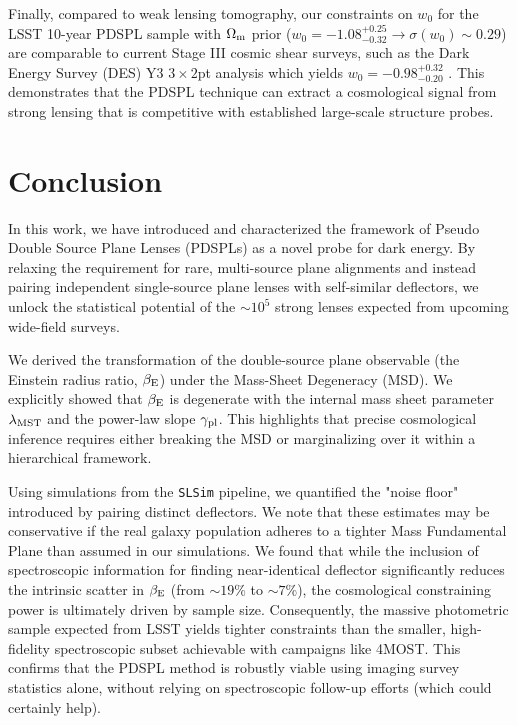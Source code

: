 \documentclass[a4paper,11pt]{article}
\begin{document}
Finally, compared to weak lensing tomography, our constraints on $w_0$ for the LSST 10-year PDSPL sample with $\Omega_{\rm m}$ prior ($w_0 = -1.08^{+0.25}_{-0.32} \rightarrow \sigma(w_0) \sim 0.29$) are comparable to current Stage III cosmic shear surveys, such as the Dark Energy Survey (DES) Y3 $3\times2$pt analysis which yields $w_0 = -0.98^{+0.32}_{-0.20}$ \citep{DES_Y3:2022}. This demonstrates that the PDSPL technique can extract a cosmological signal from strong lensing that is competitive with established large-scale structure probes.


\section{Conclusion}\label{sec:conclusion}

In this work, we have introduced and characterized the framework of Pseudo Double Source Plane Lenses (PDSPLs) as a novel probe for dark energy. By relaxing the requirement for rare, multi-source plane alignments and instead pairing independent single-source plane lenses with self-similar deflectors, we unlock the statistical potential of the $\sim 10^5$ strong lenses expected from upcoming wide-field surveys.

We derived the transformation of the double-source plane observable (the Einstein radius ratio, $\beta_{\rm E}$) under the Mass-Sheet Degeneracy (MSD). We explicitly showed that $\beta_{\rm E}$ is degenerate with the internal mass sheet parameter $\lambda_{\rm MST}$ and the power-law slope $\gamma_{\rm pl}$. This highlights that precise cosmological inference requires either breaking the MSD or marginalizing over it within a hierarchical framework.

Using simulations from the \texttt{SLSim} pipeline, we quantified the "noise floor" introduced by pairing distinct deflectors. We note that these estimates may be conservative if the real galaxy population adheres to a tighter Mass Fundamental Plane than assumed in our simulations. We found that while the inclusion of spectroscopic information for finding near-identical deflector significantly reduces the intrinsic scatter in $\beta_{\rm E}$ (from $\sim 19\%$ to $\sim 7\%$), the cosmological constraining power is ultimately driven by sample size. Consequently, the massive photometric sample expected from LSST yields tighter constraints than the smaller, high-fidelity spectroscopic subset achievable with campaigns like 4MOST. This confirms that the PDSPL method is robustly viable using imaging survey statistics alone, without relying on spectroscopic follow-up efforts (which could certainly help).
\end{document}
